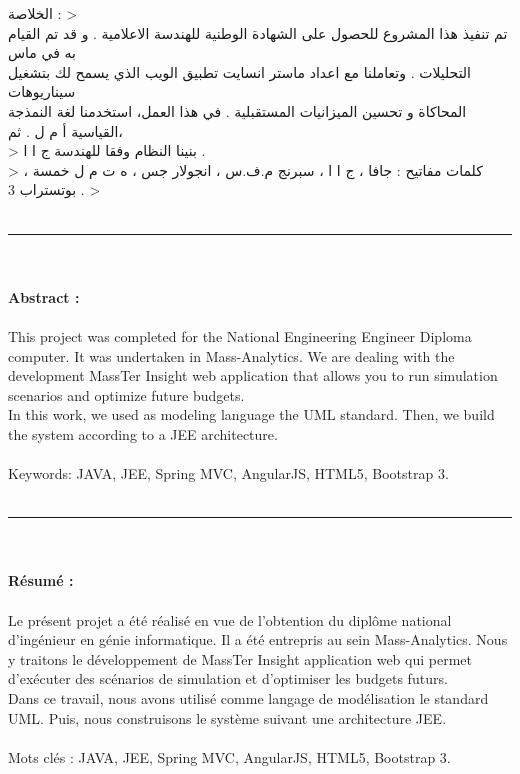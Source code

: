  \qquad \qquad \qquad \qquad \qquad \qquad \qquad \qquad \qquad \qquad \qquad \qquad \qquad \qquad \qquad \qquad \qquad \<الخلاصة : >     
\\
\< تم تنفيذ هذا المشروع للحصول على الشهادة الوطنية للهندسة الاعلامية . و قد تم القيام به في ماس \\التحليلات . وتعاملنا مع اعداد ماستر انسايت تطبيق الويب الذي يسمح لك بتشغيل سيناريوهات \\المحاكاة و تحسين الميزانيات المستقبلية . في هذا العمل، استخدمنا لغة النمذجة القياسية أ م ل .  ثم،\\>
\qquad \qquad \qquad \qquad \qquad \qquad \qquad \qquad \qquad \qquad \qquad \qquad \qquad
\< بنينا النظام وفقا للهندسة ج ا ا .\\>
\<  كلمات مفاتيح :  جافا ، ج ا ا ، سبرنج م.ف.س ، انجولار جس ، ه ت م ل خمسة ، بوتستراب 3 . >
\\ 
\\
\noindent\rule{16cm}{0.4pt}
\\
\\
\textbf{Abstract :}
\\
\\
This project was completed for the National Engineering Engineer Diploma
computer. It was undertaken in Mass-Analytics. We are dealing with the development
MassTer Insight web application that allows you to run simulation scenarios and optimize future budgets.
\\
In this work, we used as modeling language the UML standard. Then,
we build the system according to a JEE architecture.
\\
\\
Keywords: JAVA, JEE, Spring MVC, AngularJS, HTML5, Bootstrap 3.
\\
\\
\noindent\rule{16cm}{0.4pt}
\\
\\
\textbf{Résumé :}
\\
\\
Le présent projet a été réalisé en vue de l’obtention du diplôme national d’ingénieur en génie 
informatique. Il a été entrepris au sein Mass-Analytics. Nous y traitons le développement
de MassTer Insight application web qui permet d'exécuter des scénarios de simulation et d'optimiser les budgets futurs.
\\
Dans ce travail, nous avons utilisé comme langage de modélisation le standard UML. Puis,
nous construisons le système suivant une architecture JEE.
\\
\\
Mots clés : JAVA, JEE, Spring MVC, AngularJS, HTML5, Bootstrap 3.